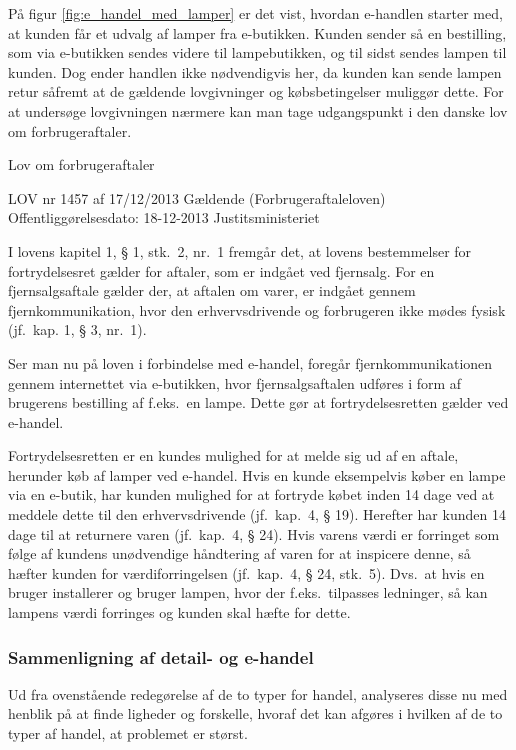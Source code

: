 På figur \ref{fig:e_handel_med_lamper} er det vist, hvordan e-handlen starter med, at kunden får et udvalg af lamper fra e-butikken. Kunden sender så en bestilling, som via e-butikken sendes videre til lampebutikken, og til sidst sendes lampen til kunden. Dog ender handlen ikke nødvendigvis her, da kunden kan sende lampen retur såfremt at de gældende lovgivninger og købsbetingelser muliggør dette. For at undersøge lovgivningen nærmere kan man tage udgangspunkt i den danske lov om forbrugeraftaler\cite{retsinformationen}.

%
Lov om forbrugeraftaler

LOV nr 1457 af 17/12/2013 Gældende
(Forbrugeraftaleloven)
Offentliggørelsesdato: 18-12-2013
Justitsministeriet
%

I lovens kapitel 1, § 1, stk.\ 2, nr.\ 1 fremgår det, at lovens bestemmelser for fortrydelsesret gælder for aftaler, som er indgået ved fjernsalg. For en  fjernsalgsaftale gælder der, at aftalen om varer, er indgået gennem fjernkommunikation, hvor den erhvervsdrivende og forbrugeren ikke mødes fysisk (jf.\ kap. 1, § 3, nr.\ 1).

Ser man nu på loven i forbindelse med e-handel, foregår fjernkommunikationen gennem internettet via e-butikken, hvor fjernsalgsaftalen udføres i form af brugerens bestilling af f.eks.\ en lampe. Dette gør at fortrydelsesretten gælder ved e-handel.

Fortrydelsesretten er en kundes mulighed for at melde sig ud af en aftale, herunder køb af lamper ved e-handel. Hvis en kunde eksempelvis køber en lampe via en e-butik, har kunden mulighed for at fortryde købet inden 14 dage ved at meddele dette til den erhvervsdrivende (jf.\ kap.\ 4, § 19). Herefter har kunden 14 dage til at returnere varen (jf.\ kap.\ 4, § 24). Hvis varens værdi er forringet som følge af kundens unødvendige håndtering af varen for at inspicere denne, så hæfter kunden for værdiforringelsen (jf.\ kap.\ 4, § 24, stk.\ 5). Dvs.\ at hvis en bruger installerer og bruger lampen, hvor der f.eks.\ tilpasses ledninger, så kan lampens værdi forringes og kunden skal hæfte for dette. 

\subsubsection{Sammenligning af detail- og e-handel}
Ud fra ovenstående redegørelse af de to typer for handel, analyseres disse nu med henblik på at finde ligheder og forskelle, hvoraf det kan afgøres i hvilken af de to typer af handel, at problemet er størst. 

